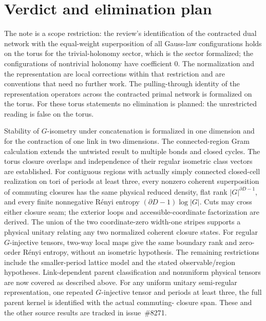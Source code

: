 \documentclass{article}
\begin{document}
\section{Verdict and elimination plan}
The note is a scope restriction: the review's identification of the
contracted dual network with the equal-weight superposition of all
Gauss-law configurations holds on the torus for the trivial-holonomy
sector, which is the sector formalized; the configurations of nontrivial
holonomy have coefficient $0$. The normalization and the representation
are local corrections within that restriction and are conventions that
need no further work. The pulling-through identity of the representation
operators across the contracted primal network is formalized on the torus.
For these torus statements no elimination is planned: the unrestricted
reading is false on the torus.

Stability of $G$-isometry under concatenation is formalized in one dimension
and for the contraction of one link in two dimensions. The connected-region Gram calculation extends
the untwisted result to multiple bonds and closed cycles. The torus closure overlaps and independence of their regular isometric
class vectors are established. For contiguous regions with actually simply
connected closed-cell realization on tori of periods at least three, every
nonzero coherent superposition of commuting closures has the same physical
reduced density, flat rank $|G|^{\partial D-1}$, and every finite nonnegative
R\'enyi entropy $(\partial D-1)\log|G|$. Cuts may cross either closure seam;
the exterior loops and accessible-coordinate factorization are derived.
The union of the two coordinate-zero width-one stripes supports a physical
unitary relating any two normalized coherent closure states. For regular
$G$-injective tensors, two-way local maps give the same boundary rank and
zero-order R\'enyi entropy, without an isometric hypothesis. The remaining
restrictions include the smaller-period lattice model and the stated
observable/region hypotheses. Link-dependent parent classification and
nonuniform physical tensors are now covered as described above. For any uniform unitary
semi-regular representation, one repeated $G$-injective tensor and periods at
least three, the full parent kernel is identified with the actual commuting-
closure span. These and the other source results are tracked in issue~\#8271.



\end{document}
